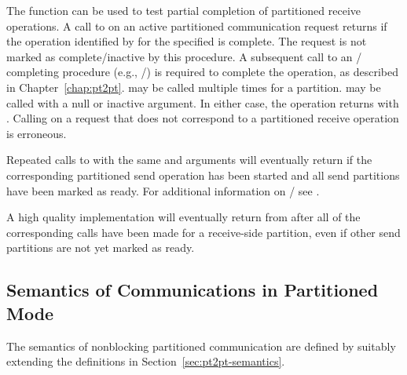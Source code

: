 The function  can be used to
test partial completion of partitioned receive operations.
A call to  on an active partitioned communication request
returns  if the
operation identified by  for the specified  is complete.  
The request is not marked as complete/inactive by this procedure.
A subsequent call to an \MPI/ completing procedure (e.g., /) is required to
complete the operation, as described in Chapter~\ref{chap:pt2pt}.
 may be called multiple times for a partition.
 may be called with a null or inactive 
argument. In either case, the operation returns with .
Calling  on a request that does not correspond to a partitioned
receive operation is erroneous.

Repeated calls to  with the same  and  arguments will 
eventually return  if the corresponding partitioned send operation has
been started and all send partitions have been marked as ready. For additional information on \MPI/ 
 see
 .

\begin{implementors}
A high quality implementation will eventually return  from  after all of the corresponding
 calls have been made for a receive-side partition, 
even if other send partitions are not yet marked as ready. 
\end{implementors}

\subsection{Semantics of Communications in Partitioned Mode}
\label{subsec:part-semantics}

The semantics of nonblocking partitioned communication are defined by suitably extending the
definitions in Section~\ref{sec:pt2pt-semantics}.

